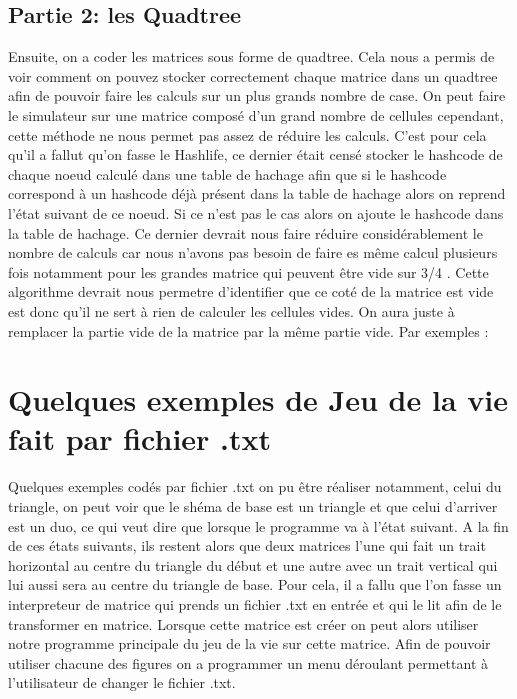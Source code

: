 \documentclass{article}
\begin{document}
\subsection{Partie 2: les Quadtree}
Ensuite, on a coder les matrices sous forme de quadtree. Cela nous a permis de voir comment on pouvez stocker correctement chaque matrice dans un quadtree afin de pouvoir faire les calculs sur un plus grands nombre de case. On peut faire le simulateur sur une matrice composé d'un grand nombre de cellules cependant, cette méthode ne nous permet pas assez de réduire les calculs. C'est pour cela qu'il a fallut qu'on fasse le Hashlife, ce dernier était censé stocker le hashcode de chaque noeud calculé dans une table de hachage afin que si le hashcode correspond à un hashcode déjà présent dans la table de hachage alors on reprend l'état suivant de ce noeud. Si ce n'est pas le cas alors on ajoute le hashcode dans la table de hachage. Ce dernier devrait nous faire réduire considérablement le nombre de calculs car nous n'avons pas besoin de faire es même calcul plusieurs fois notamment pour les grandes matrice qui peuvent être vide sur 3/4 . Cette algorithme devrait nous permetre d'identifier que ce coté de la matrice est vide est donc qu'il ne sert à rien de calculer les cellules vides. On aura juste à remplacer la partie vide de la matrice par la même partie vide. Par exemples :

 



\section{Quelques exemples de Jeu de la vie fait par fichier .txt}
Quelques exemples codés par fichier .txt on pu être réaliser notamment, celui du triangle, on peut voir que le shéma de base est un triangle et que celui d'arriver est un duo, ce qui veut dire que lorsque le programme va à l'état suivant. A la fin de ces états suivants, ils restent alors que deux matrices l'une qui fait un trait horizontal au centre du triangle du début et une autre avec un trait vertical qui lui aussi sera au centre du triangle de base.
Pour cela, il a fallu que l'on fasse un interpreteur de matrice qui prends un fichier .txt en entrée et qui le lit afin de le transformer en matrice. Lorsque cette matrice est créer on peut alors utiliser notre programme principale du jeu de la vie sur cette matrice.  
Afin de pouvoir utiliser chacune des figures on a programmer un menu déroulant permettant à l'utilisateur de changer le fichier .txt.
\end{document}
